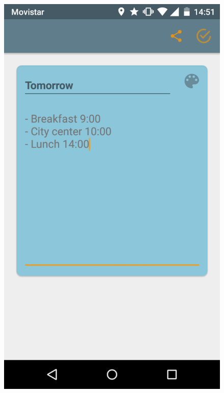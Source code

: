 \begin{itemize}
\begin{figure}[!h]
\includegraphics[scale=0.12]{Figures/crearNota3.png}

\end{figure}
\end{itemize}
